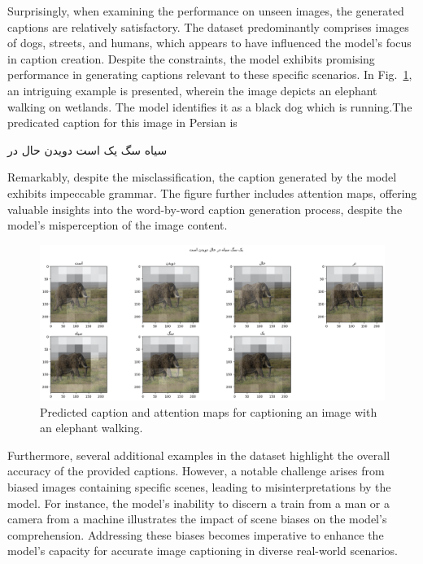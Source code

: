 \documentclass[runningheads]{llncs}
\begin{document}
Surprisingly, when examining the performance on unseen images, the generated captions are relatively satisfactory. The dataset predominantly comprises images of dogs, streets, and humans, which appears to have influenced the model's focus in caption creation. Despite the constraints, the model exhibits promising performance in generating captions relevant to these specific scenarios. In Fig.~\ref{fig5}, an intriguing example is presented, wherein the image depicts an elephant walking on wetlands. The model identifies it as a black dog which is running.The predicated caption for this image in Persian is \begin{farsi}
\arabicfont\small
 سیاه سگ یک است دویدن حال در
\end{farsi} Remarkably, despite the misclassification, the caption generated by the model exhibits impeccable grammar. The figure further includes attention maps, offering valuable insights into the word-by-word caption generation process, despite the model's misperception of the image content.

\begin{figure}
  \includegraphics[width=\textwidth]{elephant.png}
  \caption{ Predicted caption and attention maps for captioning an image with an elephant walking.} \label{fig5}
\end{figure}

Furthermore, several additional examples in the dataset highlight the overall accuracy of the provided captions. However, a notable challenge arises from biased images containing specific scenes, leading to misinterpretations by the model. For instance, the model's inability to discern a train from a man or a camera from a machine illustrates the impact of scene biases on the model's comprehension. Addressing these biases becomes imperative to enhance the model's capacity for accurate image captioning in diverse real-world scenarios.
\end{document}
